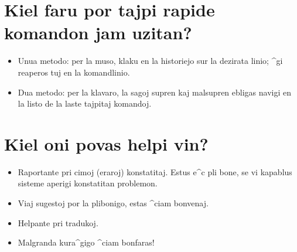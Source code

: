 \section{Kiel faru por tajpi rapide komandon jam uzitan?}
\begin{itemize}
\item Unua metodo: per la muso, klaku en la historiejo sur la dezirata
  linio; ^gi reaperos tuj en la komandlinio.
\item Dua metodo: per la klavaro, la sagoj supren kaj malsupren
  ebligas navigi en la listo de la laste tajpitaj komandoj.
\end{itemize}

\section{Kiel oni povas helpi vin?}

\begin{itemize}
\item Raportante pri cimoj (eraroj) konstatitaj.  Estus e^c pli bone,
  se vi kapablus sisteme aperigi konstatitan problemon.
\item Viaj sugestoj por la plibonigo, estas ^ciam bonvenaj.
\item Helpante pri tradukoj.
\item Malgranda kura^gigo ^ciam bonfaras!
\end{itemize}
